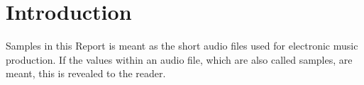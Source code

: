 ﻿\section{Introduction}
\label{sec:Introduction}

Samples in this Report is meant as the short audio files used for electronic music production. If the values within an audio file, which are also called samples, are meant, this is revealed to the reader. %